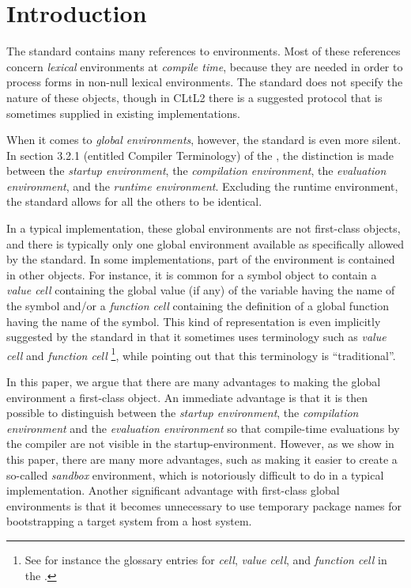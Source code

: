 \section{Introduction}

The \commonlisp{} standard contains many references to environments.
Most of these references concern \emph{lexical} environments at
\emph{compile time}, because they are needed in order to process forms
in non-null lexical environments.  The standard does not specify the
nature of these objects, though in CLtL2 \cite{Steele:1990:CLL:95411}
there is a suggested protocol that is sometimes supplied in existing
\commonlisp{} implementations. 

When it comes to \emph{global environments}, however, the standard is
even more silent.  In section 3.2.1 (entitled Compiler Terminology) of
the \commonlisp{} \hs{}, the distinction is made between the
\emph{startup environment}, the \emph{compilation environment}, the
\emph{evaluation environment}, and the \emph{runtime environment}.
Excluding the runtime environment, the standard allows for all the
others to be identical.

In a typical \commonlisp{} implementation, these global environments
are not first-class objects, and there is typically only one global
environment available as specifically allowed by the standard.  In some
implementations, part of the environment is contained in other
objects.  For instance, it is common for a symbol object to contain a
\emph{value cell} containing the global value (if any) of the variable
having the name of the symbol and/or a \emph{function cell} containing
the definition of a global function having the name of the symbol.
This kind of representation is even implicitly suggested by the
standard in that it sometimes uses terminology such as \emph{value
  cell} and \emph{function cell}%
\footnote{See for instance the glossary entries for \emph{cell},
  \emph{value cell}, and \emph{function cell} in the
  \hs{}.},  while pointing out that this terminology is ``traditional''.

In this paper, we argue that there are many advantages to making the
global environment a first-class object.  An immediate advantage is
that it is then possible to distinguish between the \emph{startup
  environment}, the \emph{compilation environment} and the
\emph{evaluation environment} so that compile-time evaluations by the
compiler are not visible in the startup-environment.  However, as we
show in this paper, there are many more advantages, such as making it
easier to create a so-called \emph{sandbox} environment, which is
notoriously difficult to do in a typical \commonlisp{}
implementation.  Another significant advantage with first-class global
environments is that it becomes unnecessary to use temporary package
names for bootstrapping a target \commonlisp{} system from a host
\commonlisp{} system.

